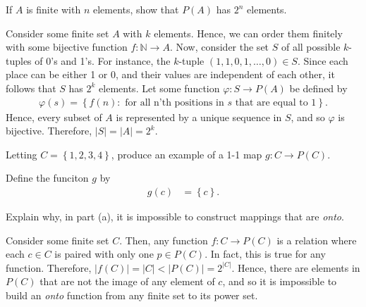 \documentclass[12pt]{article}
\newcommand{\N}{\mathbb{N}}
\newenvironment{problem}[2][Problem]{\begin{trivlist} \item[\hskip \labelsep {\bfseries #1}\hskip \labelsep {\bfseries #2.}]}{\end{trivlist}}
\newenvironment{solution}[2][Solution]{\begin{trivlist} \item[\hskip \labelsep {\bfseries #1}\hskip \labelsep {\bfseries #2.}]}{\end{trivlist}}
\begin{document}
\begin{problem}{1.6.5}
      If $A$ is finite with $n$ elements, show that $P(A)$ has $2^{n}$ elements.
      \begin{solution}{1.6.5}
	Consider some finite set $A$ with $k$ elements. Hence, we can order them finitely with some bijective function $f:\N\to A$. Now, consider the set $S$ of all possible $k$-tuples of 0's and 1's. For instance, the $k$-tuple $(1,1,0,1,\dots,0)\in S$. Since each place can be either 1 or 0, and their values are independent of each other, it follows that $S$ has $2^{k}$ elements. Let some function $\varphi:S \to P(A)$ be defined by
	\begin{align*}
	  \varphi(s)=\left\{f(n):\text{ for all n'th positions in }s\text{ that are equal to 1}\right\}.
	\end{align*}
	Hence, every subset of $A$ is represented by a unique sequence in $S$, and so $\varphi$ is bijective. Therefore, $|S|=|A|=2^{k}$. 
      \end{solution}
\end{problem}

\begin{problem}{1.6.6}
  \begin{enumerate}[label=(\alph*)]
    \item Letting $C=\left\{1,2,3,4\right\}$, produce an example of a 1-1 map $g:C\to P(C)$.
      \begin{solution}{(a)}
	   Define the funciton $g$ by 
	   \begin{align*}
	     g(c) &= \left\{c\right\}.
	   \end{align*}
	\end{solution}
     \item Explain why, in part (a), it is impossible to construct mappings that are \textit{onto}.
       \begin{solution}{(b)}
	 Consider some finite set $C$. Then, any function $f:C\to P(C)$ is a relation where each $c\in C$ is paired with only one $p\in P(C)$. In fact, this is true for any function. Therefore, $|f(C)|=|C|< |P(C)| = 2^{|C|}$. Hence, there are elements in $P(C)$ that are not the image of any element of $c$, and so it is impossible to build an \textit{onto} function from any finite set to its power set.
       \end{solution}
  \end{enumerate}
   
\end{problem}
       
\end{document}
